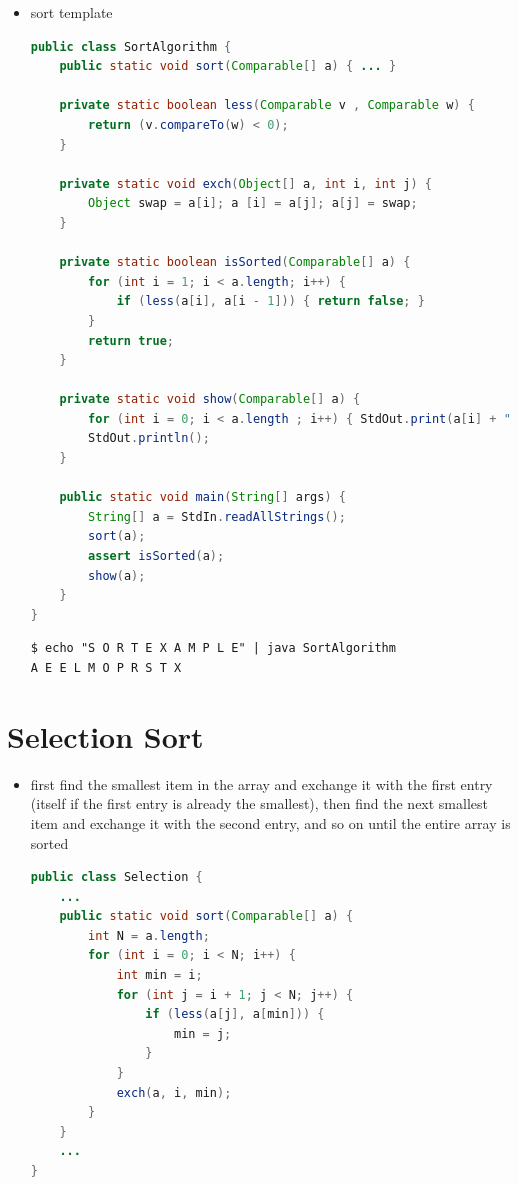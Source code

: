 \documentclass[8pt,a4paper,compress]{beamer}
\begin{document}
\begin{frame}[fragile]
\begin{itemize}
\item sort template
\begin{lstlisting}[language=Java]
public class SortAlgorithm {
    public static void sort(Comparable[] a) { ... }
    
    private static boolean less(Comparable v , Comparable w) {
        return (v.compareTo(w) < 0);
    }
    
    private static void exch(Object[] a, int i, int j) {
        Object swap = a[i]; a [i] = a[j]; a[j] = swap;
    }
    
    private static boolean isSorted(Comparable[] a) {
        for (int i = 1; i < a.length; i++) {
            if (less(a[i], a[i - 1])) { return false; }
        }
        return true;
    }
    
    private static void show(Comparable[] a) {
        for (int i = 0; i < a.length ; i++) { StdOut.print(a[i] + " "); }
        StdOut.println();
    }
    
    public static void main(String[] args) {
        String[] a = StdIn.readAllStrings();
        sort(a);
        assert isSorted(a);
        show(a);
    }
}
\end{lstlisting}

\begin{lstlisting}[language={}]
$ echo "S O R T E X A M P L E" | java SortAlgorithm
A E E L M O P R S T X
\end{lstlisting}
\end{itemize}
\end{frame}

\section{Selection Sort}
\begin{frame}[fragile]
\begin{itemize}
\item first find the smallest item in the array and exchange it with the first entry (itself if the first entry is already the smallest), then find the next smallest item and exchange it with the second entry, and so on until the entire array is sorted
\begin{lstlisting}[language=Java]
public class Selection {
    ...
    public static void sort(Comparable[] a) {
        int N = a.length;
        for (int i = 0; i < N; i++) {
            int min = i;
            for (int j = i + 1; j < N; j++) {
                if (less(a[j], a[min])) { 
                    min = j;
                }
            }
            exch(a, i, min);
        }
    }
    ...
}
\end{lstlisting}
\end{itemize}
\end{frame}
\end{document}
